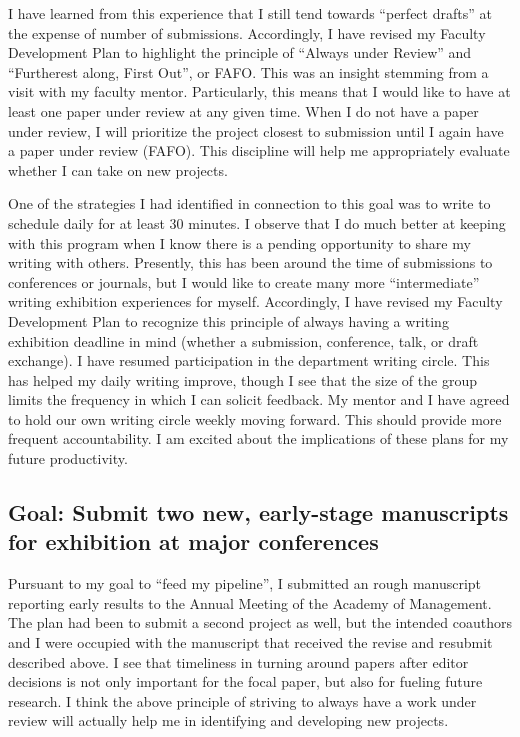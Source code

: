 \documentclass[11pt,article,oneside]{memoir}
\begin{document}
I have learned from this experience that I still tend towards
\enquote{perfect drafts} at the expense of number of submissions.
Accordingly, I have revised my Faculty Development Plan to highlight the
principle of \enquote{Always under Review} and \enquote{Furtherest
along, First Out}, or FAFO. This was an insight stemming from a visit
with my faculty mentor. Particularly, this means that I would like to
have at least one paper under review at any given time. When I do not
have a paper under review, I will prioritize the project closest to
submission until I again have a paper under review (FAFO). This
discipline will help me appropriately evaluate whether I can take on new
projects.

One of the strategies I had identified in connection to this goal was to
write to schedule daily for at least 30 minutes. I observe that I do
much better at keeping with this program when I know there is a pending
opportunity to share my writing with others. Presently, this has been
around the time of submissions to conferences or journals, but I would
like to create many more \enquote{intermediate} writing exhibition
experiences for myself. Accordingly, I have revised my Faculty
Development Plan to recognize this principle of always having a writing
exhibition deadline in mind (whether a submission, conference, talk, or
draft exchange). I have resumed participation in the department writing
circle. This has helped my daily writing improve, though I see that the
size of the group limits the frequency in which I can solicit feedback.
My mentor and I have agreed to hold our own writing circle weekly moving
forward. This should provide more frequent accountability. I am excited
about the implications of these plans for my future productivity.

\subsection{Goal: Submit two new, early-stage manuscripts for exhibition
at major
conferences}\label{goal-submit-two-new-early-stage-manuscripts-for-exhibition-at-major-conferences}

Pursuant to my goal to \enquote{feed my pipeline}, I submitted an rough
manuscript reporting early results to the Annual Meeting of the Academy
of Management. The plan had been to submit a second project as well, but
the intended coauthors and I were occupied with the manuscript that
received the revise and resubmit described above. I see that timeliness
in turning around papers after editor decisions is not only important
for the focal paper, but also for fueling future research. I think the
above principle of striving to always have a work under review will
actually help me in identifying and developing new projects.
\end{document}
